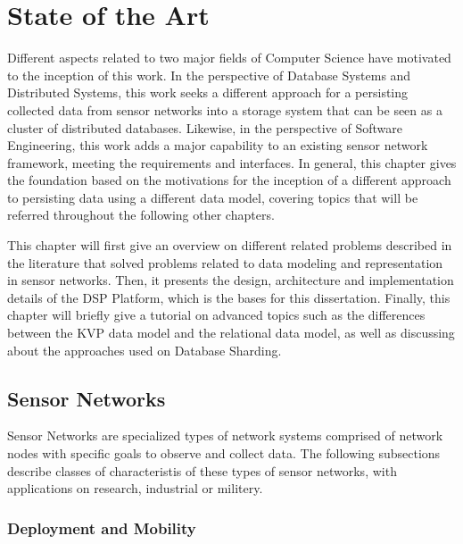 

\chapter{State of the Art}

Different aspects related to two major fields of Computer Science have
motivated to the inception of this work. In the perspective of Database
Systems and Distributed Systems, this work seeks a different approach for a
persisting collected data from sensor networks into a storage system that can
be seen as a cluster of distributed databases. Likewise, in the perspective of
Software Engineering, this work adds a major capability to an existing sensor 
network framework, meeting the requirements and interfaces. In general, this 
chapter gives the foundation based on the motivations for the inception of a 
different approach to persisting data using a different data model, covering 
topics that will be referred throughout the following other chapters.

This chapter will first give an overview on different related problems
described  in the literature that solved problems related to data modeling and 
representation in sensor networks. Then, it presents the design, architecture 
and implementation details of the DSP Platform, which is the bases for this 
dissertation. Finally, this chapter will briefly give a tutorial on advanced 
topics such as the differences between the KVP data model and the relational 
data model, as well as discussing about the approaches used on Database
Sharding.

\section{Sensor Networks}

Sensor Networks are specialized types of network systems comprised of network 
nodes with specific goals to observe and collect data. The following
subsections describe classes of characteristis of these types of sensor
networks, with applications on research, industrial or militery.

\subsection{Deployment and Mobility}

